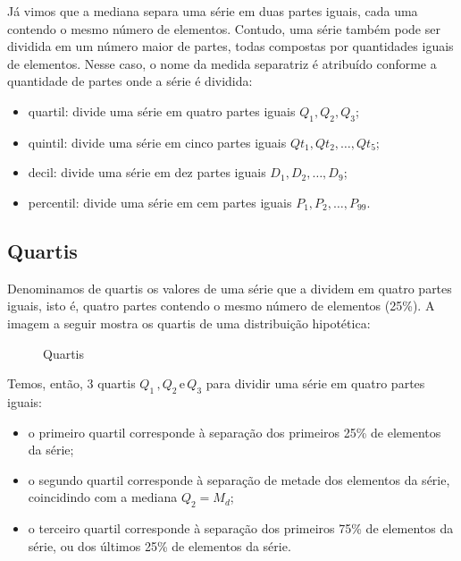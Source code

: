 Já vimos que a mediana separa uma série em duas partes iguais, cada uma contendo o mesmo número de elementos. Contudo, uma série também pode ser dividida em um número maior de partes, todas compostas por quantidades iguais de elementos. Nesse caso, o nome da medida separatriz é atribuído conforme a quantidade de partes onde a série é dividida:

\begin{itemize}
    \item quartil: divide uma série em quatro partes iguais \(Q_1 , Q_2 , Q_3\);
    \item quintil: divide uma série em cinco partes iguais \(Qt_1 , Qt_2 , \dots, Qt_5\);
    \item decil: divide uma série em dez partes iguais \(D_1 , D_2 , \dots, D_9\);
    \item percentil: divide uma série em cem partes iguais \(P_1 , P_2 , \dots, P_{99}\).
\end{itemize}
\subsection{Quartis}

Denominamos de quartis os valores de uma série que a dividem em quatro partes iguais, isto é, quatro partes contendo o mesmo número de elementos (25\%). A imagem a seguir mostra os quartis de uma
distribuição hipotética:
\medskip
\begin{figure}[ht]
    \centering
{}
\caption{Quartis}
\end{figure}

Temos, então, 3 quartis \(Q_1\,, Q_2 \,\text{e}\, Q_3\) para dividir uma série em quatro partes iguais:
\begin{itemize}[label=\diamond]
    \item o primeiro quartil corresponde à separação dos primeiros 25\% de elementos da série;
    \item o segundo quartil corresponde à separação de metade dos elementos da série, coincidindo com a mediana \(Q_2= M_d\);
    \item o terceiro quartil corresponde à separação dos primeiros 75\% de elementos da série, ou dos últimos 25\% de elementos da série.
\end{itemize}

